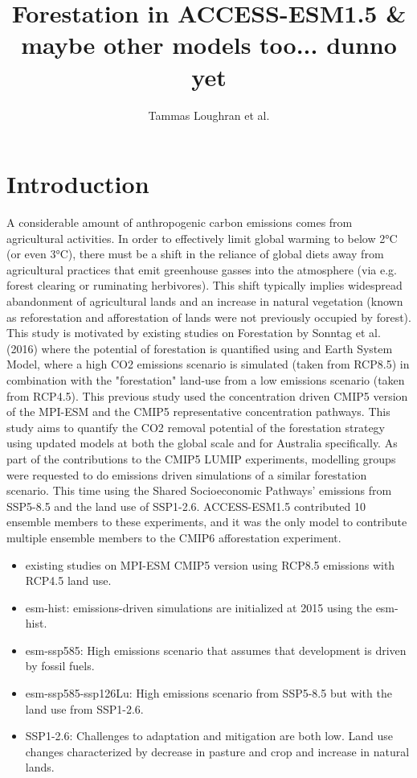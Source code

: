 \documentclass[]{article}
\title{Forestation in ACCESS-ESM1.5 \& maybe other models too... dunno yet}
\author{Tammas Loughran et al.}
\begin{document}
\maketitle

\section{Introduction}

A considerable amount of anthropogenic carbon emissions comes from agricultural activities.
In order to effectively limit global warming to below 2°C (or even 3°C), there must be a shift in the reliance of global diets away from agricultural practices that emit greenhouse gasses into the atmosphere (via e.g. forest clearing or ruminating herbivores).
This shift typically implies widespread abandonment of agricultural lands and an increase in natural vegetation (known as reforestation and afforestation of lands were not previously occupied by forest).
This study is motivated by existing studies on Forestation by Sonntag et al. (2016) \cite{sonntag_reforestation_2016} where the potential of forestation is quantified using and Earth System Model, where a high CO2 emissions scenario is simulated (taken from RCP8.5) in combination with the "forestation" land-use from a low emissions scenario (taken from RCP4.5).
This previous study used the concentration driven CMIP5 version of the MPI-ESM and the CMIP5 representative concentration pathways.
This study aims to quantify the CO2 removal potential of the forestation strategy using updated models at both the global scale and for Australia specifically.
As part of the contributions to the CMIP5 LUMIP experiments, modelling groups were requested to do emissions driven simulations of a similar forestation scenario.
This time using the Shared Socioeconomic Pathways' emissions from SSP5-8.5 and the land use of SSP1-2.6.
ACCESS-ESM1.5 contributed 10 ensemble members to these experiments, and it was the only model to contribute multiple ensemble members to the CMIP6 afforestation experiment.

\begin{itemize}
    \item existing studies on MPI-ESM CMIP5 version using RCP8.5 emissions with RCP4.5 land use. \cite{sonntag_reforestation_2016} \cite{sonntag_quantifying_2018}
    \item esm-hist: emissions-driven simulations are initialized at 2015 using the esm-hist. \cite{eyring_overview_2016}
    \item esm-ssp585: High emissions scenario that assumes that development is driven by fossil fuels. \cite{oneill_scenario_2016}
    \item esm-ssp585-ssp126Lu: High emissions scenario from SSP5-8.5 but with the land use from SSP1-2.6. \cite{lawrence_land_2016}
    \item SSP1-2.6: Challenges to adaptation and mitigation are both low. Land use changes characterized by decrease in pasture and crop and increase in natural lands. \cite{van_vuuren_energy_2017}
\end{itemize}
\end{document}
